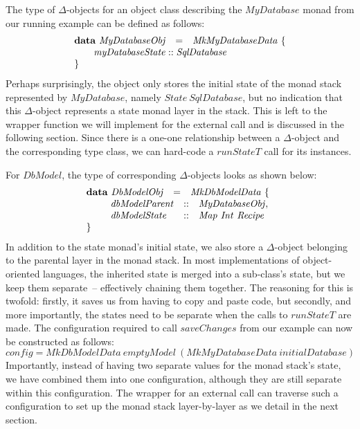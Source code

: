 The type of $\Delta$-objects for an object class describing the $\mathit{MyDatabase}$ monad from our running example can be defined as follows:
\begin{displaymath}
\begin{array}{lcl}
\mathbf{data}~\mathit{MyDatabaseObj} & = & \mathit{MkMyDatabaseData}~\{ \\
\multicolumn{3}{l}{\qquad \mathit{myDatabaseState} :: \mathit{SqlDatabase} }  \\
\} && 
\end{array}
\end{displaymath}
Perhaps surprisingly, the object only stores the initial state of the monad stack represented by $\mathit{MyDatabase}$, namely $\mathit{State}~\mathit{SqlDatabase}$, but no indication that this $\Delta$-object represents a state monad layer in the stack. This is left to the wrapper function we will implement for the external call and is discussed in the following section. Since there is a one-one relationship between a $\Delta$-object and the corresponding type class, we can hard-code a $\mathit{runStateT}$ call for its instances.

For $\mathit{DbModel}$, the type of corresponding $\Delta$-objects looks as shown below:
\begin{displaymath}
\begin{array}{lcl}
\mathbf{data}~\mathit{DbModelObj} & = & \mathit{MkDbModelData}~\{ \\
\multicolumn{3}{l}{\qquad \begin{array}{lcl}
\mathit{dbModelParent} & :: & \mathit{MyDatabaseObj}, \\
\mathit{dbModelState} & :: & \mathit{Map}~\mathit{Int}~\mathit{Recipe}
\end{array}  }  \\
\} && 
\end{array}
\end{displaymath}
In addition to the state monad's initial state, we also store a $\Delta$-object belonging to the parental layer in the monad stack.
In most implementations of object-oriented languages,
the inherited state is merged into a sub-class's state, but we keep them separate~-- effectively chaining them together.
The reasoning for this is twofold: firstly, it saves us from having to copy and paste code, but secondly, and more importantly, the states need to be separate when the calls to $\mathit{runStateT}$ are made. The configuration required to call $\mathit{saveChanges}$ from our example can now be constructed as follows:
\begin{displaymath}
\mathit{config} = \mathit{MkDbModelData}~\mathit{emptyModel}~(\mathit{MkMyDatabaseData}~\mathit{initialDatabase})
\end{displaymath}
Importantly, instead of having two separate values for the monad stack's state, we have combined them into one configuration, although they are still separate within this configuration. The wrapper for an external call can traverse such a configuration to set up
%
the monad stack layer-by-layer as we detail in the next section.

